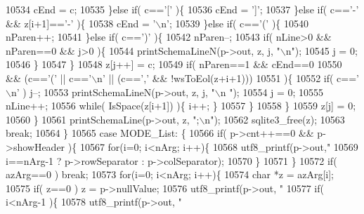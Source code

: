 \begin{DoxyCode}
{{{{{{{{{{10534             cEnd = c;
10535           \}\textcolor{keywordflow}{else} \textcolor{keywordflow}{if}( c==\textcolor{charliteral}{'['} )\{
10536             cEnd = \textcolor{charliteral}{']'};
10537           \}\textcolor{keywordflow}{else} \textcolor{keywordflow}{if}( c==\textcolor{charliteral}{'-'} && z[i+1]==\textcolor{charliteral}{'-'} )\{
10538             cEnd = \textcolor{charliteral}{'\(\backslash\)n'};
10539           \}\textcolor{keywordflow}{else} \textcolor{keywordflow}{if}( c==\textcolor{charliteral}{'('} )\{
10540             nParen++;
10541           \}\textcolor{keywordflow}{else} \textcolor{keywordflow}{if}( c==\textcolor{charliteral}{')'} )\{
10542             nParen--;
10543             \textcolor{keywordflow}{if}( nLine>0 && nParen==0 && j>0 )\{
10544               printSchemaLineN(p->out, z, j, \textcolor{stringliteral}{"\(\backslash\)n"});
10545               j = 0;
10546             \}
10547           \}
10548           z[j++] = c;
10549           \textcolor{keywordflow}{if}( nParen==1 && cEnd==0
10550            && (c==\textcolor{charliteral}{'('} || c==\textcolor{charliteral}{'\(\backslash\)n'} || (c==\textcolor{charliteral}{','} && !wsToEol(z+i+1)))
10551           )\{
10552             \textcolor{keywordflow}{if}( c==\textcolor{charliteral}{'\(\backslash\)n'} ) j--;
10553             printSchemaLineN(p->out, z, j, \textcolor{stringliteral}{"\(\backslash\)n  "});
10554             j = 0;
10555             nLine++;
10556             \textcolor{keywordflow}{while}( IsSpace(z[i+1]) )\{ i++; \}
10557           \}
10558         \}
10559         z[j] = 0;
10560       \}
10561       printSchemaLine(p->out, z, \textcolor{stringliteral}{";\(\backslash\)n"});
10562       sqlite3_free(z);
10563       \textcolor{keywordflow}{break};
10564     \}
10565     \textcolor{keywordflow}{case} MODE_List: \{
10566       \textcolor{keywordflow}{if}( p->cnt++==0 && p->showHeader )\{
10567         \textcolor{keywordflow}{for}(i=0; i<nArg; i++)\{
10568           utf8_printf(p->out,\textcolor{stringliteral}{"%
10569                   i==nArg-1 ? p->rowSeparator : p->colSeparator);
10570         \}
10571       \}
10572       \textcolor{keywordflow}{if}( azArg==0 ) \textcolor{keywordflow}{break};
10573       \textcolor{keywordflow}{for}(i=0; i<nArg; i++)\{
10574         \textcolor{keywordtype}{char} *z = azArg[i];
10575         \textcolor{keywordflow}{if}( z==0 ) z = p->nullValue;
10576         utf8_printf(p->out, \textcolor{stringliteral}{"%
10577         \textcolor{keywordflow}{if}( i<nArg-1 )\{
10578           utf8_printf(p->out, \textcolor{stringliteral}{"%
}}}}}}}}}}}}}
\end{DoxyCode}
